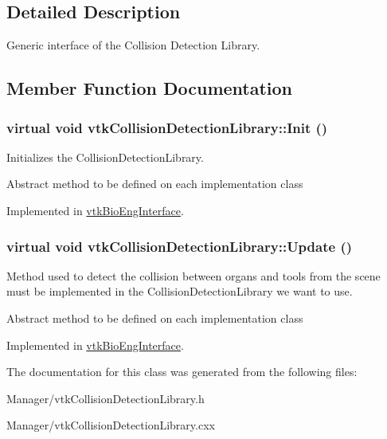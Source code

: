 \subsection{Detailed Description}
Generic interface of the Collision Detection Library. 

\subsection{Member Function Documentation}
\hypertarget{classvtkCollisionDetectionLibrary_ac29256d189958f001608f8f5d170a73c}{
\subsubsection[{Init}]{\setlength{\rightskip}{0pt plus 5cm}virtual void vtkCollisionDetectionLibrary::Init ()}}
\label{classvtkCollisionDetectionLibrary_ac29256d189958f001608f8f5d170a73c}


Initializes the CollisionDetectionLibrary. 

Abstract method to be defined on each implementation class 

Implemented in \hyperlink{classvtkBioEngInterface_a52f71a20ab8e16bbeb357642975a5b67}{vtkBioEngInterface}.

\hypertarget{classvtkCollisionDetectionLibrary_ae3ce4d5055eee783a8bf9f06f62f5667}{
\subsubsection[{Update}]{\setlength{\rightskip}{0pt plus 5cm}virtual void vtkCollisionDetectionLibrary::Update ()}}
\label{classvtkCollisionDetectionLibrary_ae3ce4d5055eee783a8bf9f06f62f5667}


Method used to detect the collision between organs and tools from the scene must be implemented in the CollisionDetectionLibrary we want to use. 

Abstract method to be defined on each implementation class 

Implemented in \hyperlink{classvtkBioEngInterface_af04a067b7a6f524faa7ff14552147260}{vtkBioEngInterface}.



The documentation for this class was generated from the following files:\begin{DoxyCompactItemize}
\item 
Manager/vtkCollisionDetectionLibrary.h\item 
Manager/vtkCollisionDetectionLibrary.cxx\end{DoxyCompactItemize}
